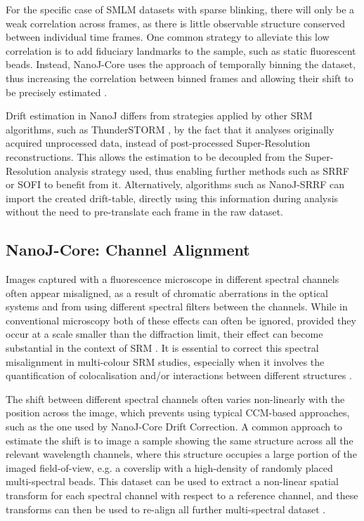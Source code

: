  For the specific case of SMLM datasets with sparse blinking, there will only be a weak correlation across frames, as there is little observable structure conserved between individual time frames. One common strategy to alleviate this low correlation is to add fiduciary landmarks to the sample, such as static fluorescent beads. Instead, NanoJ-Core uses the approach of temporally binning the dataset, thus increasing the correlation between binned frames and allowing their shift to be precisely estimated \cite{mlodzianoski2011sample}. 

 Drift estimation in NanoJ differs from strategies applied by other SRM algorithms, such as ThunderSTORM \cite{ovesny2014thunderstorm}, by the fact that it analyses originally acquired unprocessed data, instead of post-processed Super-Resolution reconstructions. This allows the estimation to be decoupled from the Super-Resolution analysis strategy used, thus enabling further methods such as SRRF or SOFI \cite{dertinger2009fast} to benefit from it. Alternatively, algorithms such as NanoJ-SRRF can import the created drift-table, directly using this information during analysis without the need to pre-translate each frame in the raw dataset.

\subsection*{NanoJ-Core: Channel Alignment}

 Images captured with a fluorescence microscope in different spectral channels often appear misaligned, as a result of chromatic aberrations in the optical systems and from using different spectral filters between the channels. While in conventional microscopy both of these effects can often be ignored, provided they occur at a scale smaller than the diffraction limit, their effect can become substantial in the context of SRM \cite{erdelyi2013correcting}. It is essential to correct this spectral misalignment in multi-colour SRM studies, especially when it involves the quantification of colocalisation and/or interactions between different structures \cite{bock2007two,van2009multicolor,niekamp2017high}. 
 
 The shift between different spectral channels often varies non-linearly with the position across the image, which prevents using typical CCM-based approaches, such as the one used by NanoJ-Core Drift Correction. A common approach to estimate the shift is to image a sample showing the same structure across all the relevant wavelength channels, where this structure occupies a large portion of the imaged field-of-view, e.g. a coverslip with a high-density of randomly placed multi-spectral beads. This dataset can be used to extract a non-linear spatial transform for each spectral channel with respect to a reference channel, and these transforms can then be used to re-align all further multi-spectral dataset \cite{arganda2006consistent,annibale2012identification}. 
 
